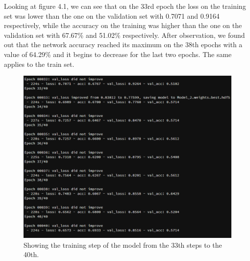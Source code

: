 Looking at figure 4.1, we can see that on the 33rd epoch the loss on the training set was lower than the one on the validation set with 0.7071 and 0.9164 respectively, while the accuracy on the training was higher than the one on the validation set with 67.67\% and 51.02\% respectively.
After observation, we found out that the network accuracy reached its maximum on the 38th epochs with a value of 64.29\% and it begins to decrease for the last two epochs. The same applies to the train set.\\
\begin{figure}[ht]
    \centering
    \includegraphics{Figures/tp}
    \decoRule
    \caption [Showing the training step of the model from the 33th steps to the 40th.]{Showing the training step of the model from the 33th steps to the 40th.}
    \label{fig:la}
    \end{figure}\hfill \\

